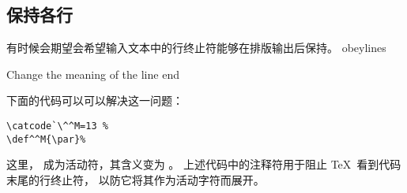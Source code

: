 \documentclass{book}
\begin{document}
\subsection{保持各行}

有时候会期望会希望输入文本中的行终止符能够在排版输出后保持。
%
\cstoidx obeylines\par\howto Change the meaning of the line end\par
下面的代码可以可以解决这一问题：
\begin{verbatim}
\catcode`\^^M=13 %
\def^^M{\par}%
\end{verbatim}
这里， 成为活动符，其含义变为 。
上述代码中的注释符用于阻止 \TeX\ 看到代码末尾的行终止符，
以防它将其作为活动字符而展开。
\end{document}
